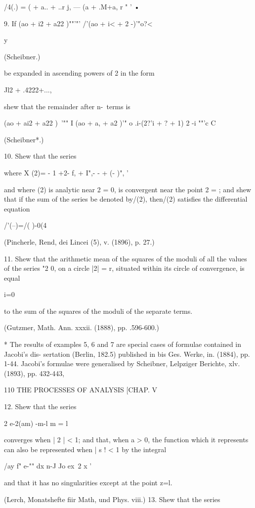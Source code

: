 {{{{/4(.) = ( + a.. + ..r j, — (a + .M+a, r " ' •

9. If (ao + i2 + a22 )""'"' /'(ao + i< + 2 -)'"o?<

y

(Scheibner.)

be expanded in ascending powers of 2 in the form

Jl2 + .4222+...,

shew that the remainder after n-\ terms is

(ao + ai2 + a22 )~'"" I (ao + a, + a2 )'" o .i-(2?'i + ? + 1) 2 -i
""'c C

(Scheibner*.)

10. Shew that the series

where X (2)= - 1 +2- f, + I",- - + (- )", '

and where (2) is analytic near 2 = 0, is convergent near the point 2 =
; and shew that if the sum of the series be denoted by/(2), then/(2)
satisfies the differential equation

/'(--)=/( )-0(4

(Pincherle, Rend, dei Lincei (5), v. (1896), p. 27.)

11. Shew that the arithmetic mean of the squares of the moduli of all
the values of the series "2 0, on a circle |2| = r, situated within
its circle of convergence, is equal

 i=0

to the sum of the squares of the moduli of the separate terms.

(Gutzmer, Math. Ann. xxxii. (1888), pp. .596-600.)

* The results of examples 5, 6 and 7 are special cases of formulae
contained in Jacobi's dis- sertation (Berlin, 182.5) published in bis
Ges. Werke, in. (1884), pp. 1-44. Jacobi's formulae were generalised
by Scheibner, Lelpziger Berichte, xlv. (1893), pp. 432-443,

110 THE PROCESSES OF ANALYSIS [CHAP. V

12. Shew that the series

2 e-2(am) -m-l m = l

converges when | 2 | < 1; and that, when a > 0, the function which it
represents can also be represented when | s ! < 1 by the integral

/ay f" e-"" dx n-J Jo ex\ 2 x '

and that it has no singularities except at the point z=l.

(Lerch, Monatshefte fiir Math, und Phys. viii.) 13. Shew that the
series

}}}}
